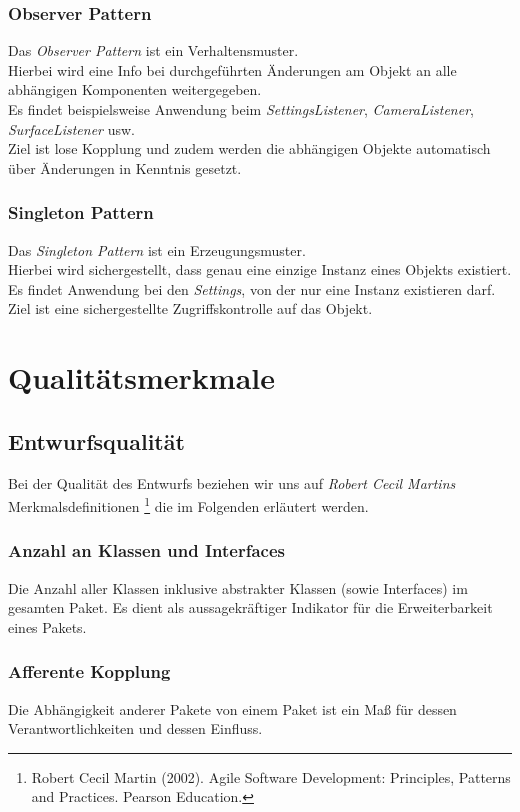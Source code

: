 \documentclass[10pt]{scrreprt}
\begin{document}
\subsection{Observer Pattern}
Das \textit{Observer Pattern} ist ein Verhaltensmuster. \\ Hierbei wird eine Info bei durchgeführten Änderungen am Objekt an alle abhängigen Komponenten weitergegeben. \\ Es findet beispielsweise Anwendung beim \textit{SettingsListener}, \textit{CameraListener}, \textit{SurfaceListener} usw. \\ 
Ziel ist lose Kopplung und zudem werden die abhängigen Objekte automatisch über Änderungen in Kenntnis gesetzt.

\subsection{Singleton Pattern}
Das \textit{Singleton Pattern} ist ein Erzeugungsmuster. \\ Hierbei wird sichergestellt, dass genau eine einzige Instanz eines Objekts existiert. \\ Es findet Anwendung bei den \textit{Settings}, von der nur eine Instanz existieren darf. \\ Ziel ist eine sichergestellte Zugriffskontrolle auf das Objekt.




\chapter{Qualitätsmerkmale}
\section{Entwurfsqualität}
Bei der Qualität des Entwurfs beziehen wir uns auf \textit{Robert Cecil Martins} Merkmalsdefinitionen \footnote{Robert Cecil Martin (2002). Agile Software Development: Principles, Patterns and Practices. Pearson Education.} die im Folgenden erläutert werden.

\subsection*{Anzahl an Klassen und Interfaces}
Die Anzahl aller Klassen inklusive abstrakter Klassen (sowie Interfaces) im gesamten Paket. Es dient als aussagekräftiger Indikator für die Erweiterbarkeit eines Pakets.

\subsection*{Afferente Kopplung}
Die Abhängigkeit anderer Pakete von einem Paket ist ein Maß für dessen Verantwortlichkeiten und dessen Einfluss.
\end{document}
